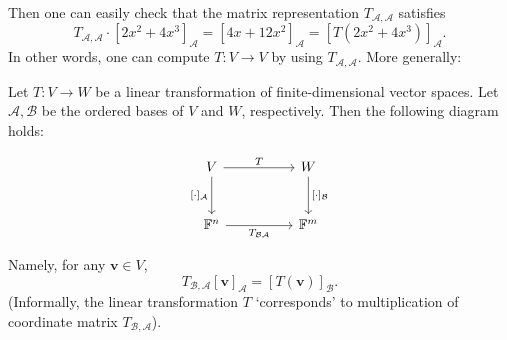 Then one can easily check that the matrix representation $T_{\mathcal{A}, \mathcal{A}}$ satisfies 
$$T_{\mathcal{A}, \mathcal{A}} \cdot 
[2x^2 + 4x^3]_{\mathcal{A}}
=
[4x + 12x^2]_{\mathcal{A}} = [T(2x^2 + 4x^3)]_{\mathcal{A}}.$$
In other words, one can compute $T:V \to V$ by using $T_{\mathcal{A}, \mathcal{A}}$. More generally:
\begin{theorem}\label{thm: matrix-Representation}
Let \( T : V \to W \) be a linear transformation of finite-dimensional vector spaces.  
Let \( \mathcal{A}, \mathcal{B} \) be the ordered bases of \( V \) and \( W \), respectively.  
Then the following diagram holds:
\begin{figure}[h!]
\centering
\[
\begin{tikzcd}[row sep=large, column sep=huge]
V \arrow[r, "T"] \arrow[d, "{[\cdot]_{\mathcal{A}}}"'] 
  & W \arrow[d, "{[\cdot]_{\mathcal{B}}}"] \\
\mathbb{F}^n \arrow[r, "T_{\mathcal{B}\mathcal{A}}"'] 
  & \mathbb{F}^m
\end{tikzcd}
\]
\end{figure}

Namely, for any \( \mathbf{v} \in V \), 
$$ T_{\mathcal{B},\mathcal{A}} [\mathbf{v}]_{\mathcal{A}} = [T (\mathbf{v})]_{\mathcal{B}}.$$
(Informally, the linear transformation $T$ `corresponds' to multiplication of coordinate matrix $T_{\mathcal{B},\mathcal{A}}$).
\end{theorem}
